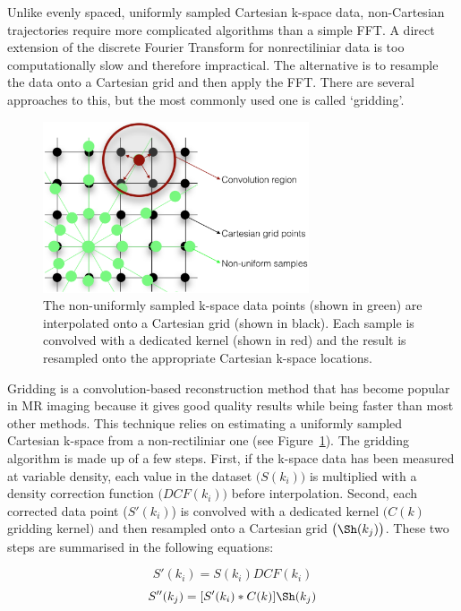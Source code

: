Unlike evenly spaced, uniformly sampled Cartesian k-space data, non-Cartesian trajectories require more complicated algorithms than a simple FFT.
A direct extension of the discrete Fourier Transform for nonrectiliniar data is too computationally slow and therefore impractical.
The alternative is to resample the data onto a Cartesian grid and then apply the FFT.
There are several approaches to this, but the most commonly used one is called `gridding'.

\begin{figure}[ht]
    \centering
    \includegraphics[width=0.7\textwidth,keepaspectratio]{images/mri/gridding}
    \caption{The non-uniformly sampled k-space data points (shown in green) are interpolated onto a Cartesian grid (shown in black). Each sample is convolved with a dedicated kernel (shown in red) and the result is resampled onto the appropriate Cartesian k-space locations.}
    \label{fig:gridding}
\end{figure}

Gridding is a convolution-based reconstruction method that has become popular in MR imaging because it gives good quality results while being faster than most other methods.
This technique relies on estimating a uniformly sampled Cartesian k-space from a non-rectiliniar one (see Figure~\ref{fig:gridding}).
The gridding algorithm is made up of a few steps.
First, if the k-space data has been measured at variable density, each value in the dataset $\big( S(k_i) \big)$ is multiplied with a density correction function $\big( DCF(k_i) \big)$ before interpolation.
Second, each corrected data point ($S'(k_i)$) is convolved with a dedicated kernel $\big( C(k)$ gridding kernel$\big)$ and then resampled onto a Cartesian grid $\big( \Sh (k_j)\big)$. 
These two steps are summarised in the following equations:

\begin{equation}\label{eq:gridding1}
        S'(k_i) = S(k_i) DCF(k_i)
\end{equation}
\begin{equation}\label{eq:gridding2}
        S''(k_j) = [S'(k_i) * C(k)] \Sh (k_j)
\end{equation}

